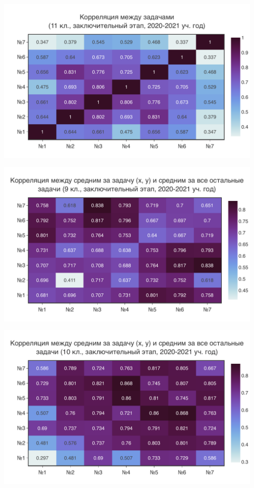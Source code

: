 \includegraphics[width=\linewidth]{../export/pdf/results/2021/respa/grade11.pdf}

\includegraphics[width=\linewidth]{../export/pdf/results/2021/respa/grade9-avg.pdf}

\includegraphics[width=\linewidth]{../export/pdf/results/2021/respa/grade10-avg.pdf}

